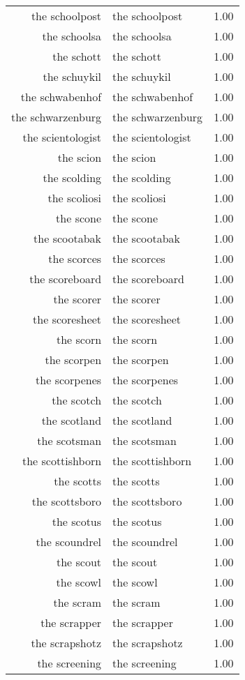 \begin{table}[ht]
\begin{tabular}{rlr}
  the schoolpost & the schoolpost & 1.00 \\ 
  the schoolsa & the schoolsa & 1.00 \\ 
  the schott & the schott & 1.00 \\ 
  the schuykil & the schuykil & 1.00 \\ 
  the schwabenhof & the schwabenhof & 1.00 \\ 
  the schwarzenburg & the schwarzenburg & 1.00 \\ 
  the scientologist & the scientologist & 1.00 \\ 
  the scion & the scion & 1.00 \\ 
  the scolding & the scolding & 1.00 \\ 
  the scoliosi & the scoliosi & 1.00 \\ 
  the scone & the scone & 1.00 \\ 
  the scootabak & the scootabak & 1.00 \\ 
  the scorces & the scorces & 1.00 \\ 
  the scoreboard & the scoreboard & 1.00 \\ 
  the scorer & the scorer & 1.00 \\ 
  the scoresheet & the scoresheet & 1.00 \\ 
  the scorn & the scorn & 1.00 \\ 
  the scorpen & the scorpen & 1.00 \\ 
  the scorpenes & the scorpenes & 1.00 \\ 
  the scotch & the scotch & 1.00 \\ 
  the scotland & the scotland & 1.00 \\ 
  the scotsman & the scotsman & 1.00 \\ 
  the scottishborn & the scottishborn & 1.00 \\ 
  the scotts & the scotts & 1.00 \\ 
  the scottsboro & the scottsboro & 1.00 \\ 
  the scotus & the scotus & 1.00 \\ 
  the scoundrel & the scoundrel & 1.00 \\ 
  the scout & the scout & 1.00 \\ 
  the scowl & the scowl & 1.00 \\ 
  the scram & the scram & 1.00 \\ 
  the scrapper & the scrapper & 1.00 \\ 
  the scrapshotz & the scrapshotz & 1.00 \\ 
  the screening & the screening & 1.00 \\ 

\end{tabular}
\end{table}
